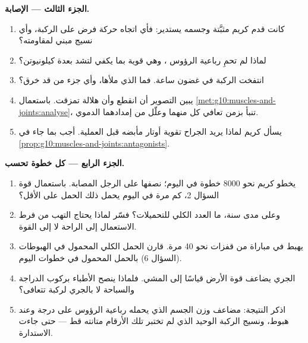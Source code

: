\begin{problem}
\medskip
\noindent\textbf{الجزء الثالث --- الإصابة.}
\begin{enumerate}[resume]
  \item كانت قدم كريم مثبَّتة وجسمه يستدير: فأي اتجاه حركة فرض على
        الركبة، وأي نسيج مبني لمقاومته؟
  \item لماذا لم تحمِ رباعية الرؤوس ، وهي قوية بما يكفي لتشد
        بعدة كيلونيوتن؟
  \item انتفخت الركبة في غضون ساعة. فما الذي ملأها، وأي جزء من 
        قد خرق؟
  \item يبين التصوير أن  انقطع وأن هلالة تمزقت. باستعمال
        \cref{met:g10:muscles-and-joints:analyse}، تنبأ بزمن تعافي كل
        منهما وعلّل من إمدادهما الدموي.
  \item يسأل كريم لماذا يريد الجراح تقوية أوتار مأبضه قبل العملية.
        أجب بما جاء في \cref{prop:g10:muscles-and-joints:antagonists}.
\end{enumerate}

\medskip
\noindent\textbf{الجزء الرابع --- كل خطوة تحسب.}
\begin{enumerate}[resume]
  \item يخطو كريم نحو 8000 خطوة في اليوم؛ نصفها على الرجل المصابة.
        باستعمال قوة السؤال 2، كم مرة في اليوم يحمل  ذلك الحمل
        على الأقل؟
  \item وعلى مدى سنة، ما العدد الكلي للتحميلات؟ فسّر لماذا يحتاج 
        التهب من فرط الاستعمال إلى الراحة لا إلى القوة.
  \item يهبط في مباراة من قفزات نحو 40 مرة. قارن الحمل الكلي المحمول
        في الهبوطات (السؤال 6) بالحمل المحمول في خطوات اليوم.
  \item الجري يضاعف قوة الأرض قياسًا إلى المشي. فلماذا ينصح الأطباء
        بركوب الدراجة والسباحة لا بالجري لركبة تتعافى؟
  \item اذكر النتيجة: مضاعف وزن الجسم الذي يحمله  رباعية الرؤوس على
        درجة وعند هبوط، ونسيج الركبة الوحيد الذي لم تختبر تلك الأرقام
        متانته قط --- حتى جاءت الاستدارة.
\end{enumerate}
\end{problem}
